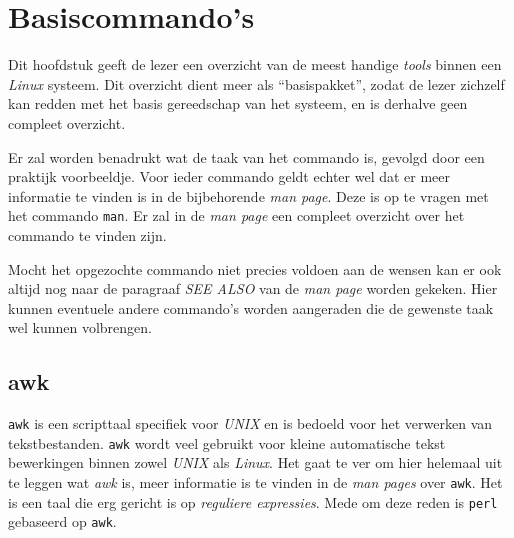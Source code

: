%
%
%
%

\chapter{Basiscommando's}\label{h.basis}
Dit hoofdstuk geeft de lezer een overzicht van de meest handige \emph{tools} binnen een \emph{Linux} systeem. Dit overzicht dient meer als ``basispakket'', zodat de lezer zichzelf kan redden met het basis gereedschap van het systeem, en is derhalve geen compleet overzicht. 

Er zal worden benadrukt wat de taak van het commando is, gevolgd door een praktijk voorbeeldje. Voor ieder commando geldt echter wel dat er meer informatie te vinden is in de bijbehorende \emph{man page}. Deze is op te vragen met het commando \texttt{man}. Er zal in de \emph{man page} een compleet overzicht over het commando te vinden zijn. 

Mocht het opgezochte commando niet precies voldoen aan de wensen kan er ook altijd nog naar de paragraaf \emph{SEE ALSO} van de \emph{man page} worden gekeken. Hier kunnen eventuele andere commando's worden aangeraden die de gewenste taak wel kunnen volbrengen. 

\section{awk}
\texttt{awk} is een scripttaal specifiek voor \emph{UNIX} en is bedoeld voor het verwerken van tekstbestanden. \texttt{awk} wordt veel gebruikt voor kleine automatische tekst bewerkingen binnen zowel \emph{UNIX} als \emph{Linux}. Het gaat te ver om hier helemaal uit te leggen wat \emph{awk} is, meer informatie is te vinden in de \emph{man pages} over \texttt{awk}. Het is een taal die erg gericht is op \emph{reguliere expressies}. Mede om deze reden is \texttt{perl} gebaseerd op \texttt{awk}.

